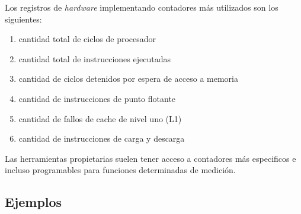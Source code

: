 \documentclass[a4paper]{report}
\begin{document}
Los registros de {\it hardware} implementando contadores m\'as utilizados son los
siguientes:

\begin{enumerate}
\item cantidad total de ciclos de procesador
\item cantidad total de instrucciones ejecutadas
\item cantidad de ciclos detenidos por espera de acceso a memoria
\item cantidad de instrucciones de punto flotante
\item cantidad de fallos de cache de nivel uno (L1)
\item cantidad de instrucciones de carga y descarga
\end{enumerate}

Las herramientas propietarias suelen tener acceso a contadores m\'as especificos e
incluso programables para funciones determinadas de medici\'on.

\subsection{Ejemplos}
\end{document}
